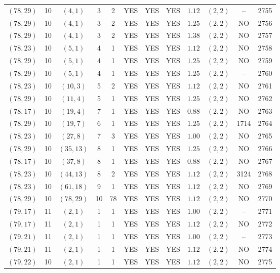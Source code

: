 \begin{longtable}{|c|c|c|c|c|c|c|c|c|c|c|c|}
$(78,29)$ & 10 & $(4,1)$ & 3 & 2 & YES & YES & YES & $1.12$ & $(2,2)$ & -- & 2755\\
$(78,29)$ & 10 & $(4,1)$ & 3 & 2 & YES & YES & YES & $1.25$ & $(2,2)$ & NO & 2756\\
$(78,29)$ & 10 & $(4,1)$ & 3 & 2 & YES & YES & YES & $1.38$ & $(2,2)$ & NO & 2757\\
$(78,23)$ & 10 & $(5,1)$ & 4 & 1 & YES & YES & YES & $1.12$ & $(2,2)$ & NO & 2758\\
$(78,29)$ & 10 & $(5,1)$ & 4 & 1 & YES & YES & YES & $1.25$ & $(2,2)$ & NO & 2759\\
$(78,29)$ & 10 & $(5,1)$ & 4 & 1 & YES & YES & YES & $1.25$ & $(2,2)$ & -- & 2760\\
$(78,23)$ & 10 & $(10,3)$ & 5 & 2 & YES & YES & YES & $1.12$ & $(2,2)$ & NO & 2761\\
$(78,29)$ & 10 & $(11,4)$ & 5 & 1 & YES & YES & YES & $1.25$ & $(2,2)$ & NO & 2762\\
$(78,17)$ & 10 & $(19,4)$ & 7 & 1 & YES & YES & YES & $0.88$ & $(2,2)$ & NO & 2763\\
$(78,29)$ & 10 & $(19,7)$ & 6 & 1 & YES & YES & YES & $1.25$ & $(2,2)$ & 1714 & 2764\\
$(78,23)$ & 10 & $(27,8)$ & 7 & 3 & YES & YES & YES & $1.00$ & $(2,2)$ & NO & 2765\\
$(78,29)$ & 10 & $(35,13)$ & 8 & 1 & YES & YES & YES & $1.25$ & $(2,2)$ & NO & 2766\\
$(78,17)$ & 10 & $(37,8)$ & 8 & 1 & YES & YES & YES & $0.88$ & $(2,2)$ & NO & 2767\\
$(78,23)$ & 10 & $(44,13)$ & 8 & 2 & YES & YES & YES & $1.12$ & $(2,2)$ & 3124 & 2768\\
$(78,23)$ & 10 & $(61,18)$ & 9 & 1 & YES & YES & YES & $1.12$ & $(2,2)$ & NO & 2769\\
$(78,29)$ & 10 & $(78,29)$ & 10 & 78 & YES & YES & YES & $1.12$ & $(2,2)$ & NO & 2770\\
$(79,17)$ & 11 & $(2,1)$ & 1 & 1 & YES & YES & YES & $1.00$ & $(2,2)$ & -- & 2771\\
$(79,17)$ & 11 & $(2,1)$ & 1 & 1 & YES & YES & YES & $1.12$ & $(2,2)$ & NO & 2772\\
$(79,21)$ & 11 & $(2,1)$ & 1 & 1 & YES & YES & YES & $1.00$ & $(2,2)$ & -- & 2773\\
$(79,21)$ & 11 & $(2,1)$ & 1 & 1 & YES & YES & YES & $1.12$ & $(2,2)$ & NO & 2774\\
$(79,22)$ & 10 & $(2,1)$ & 1 & 1 & YES & YES & YES & $1.12$ & $(2,2)$ & NO & 2775\\

\end{longtable}
